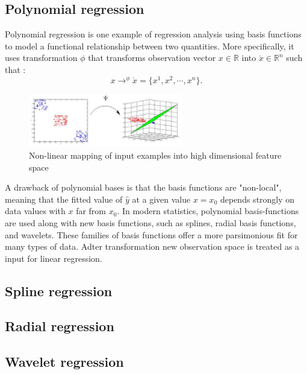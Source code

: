 \subsection{Polynomial regression}
\FloatBarrier
Polynomial regression is one example of regression analysis using basis functions to model 
a functional relationship between two quantities.
More specifically, it uses transformation $\phi$  that transforms observation vector 
$x \in \mathbb{R}$ into  $ \acute{x} \in \mathbb{R}^{n}$ such that :
\begin{equation}
 x \to^{\phi} \acute{x} = \{x^{1}, x^{2}, \cdots, x^{n}\}.
\end{equation}
\begin{figure}[htb] 
	\label{fig:space_transformation}
	\centering
	\includegraphics[width=0.6\textwidth]{figures/space_transformation}
	\caption{Non-linear mapping of input examples into high dimensional feature space}
\end{figure}
A drawback of polynomial bases is that the basis functions are "non-local",
meaning that the fitted value of $\hat{y}$ at a given value $x = x_{0}$ depends strongly on 
data values with $x$ far from $x_{0}$.
In modern statistics, polynomial basis-functions are used along with new basis functions,
such as splines, radial basis functions, and wavelets.
These families of basis functions offer a more parsimonious fit for many types of data. 
Adter transformation new observation space is treated as a input for linear regression.

\subsection{Spline regression}
\FloatBarrier
\subsection{Radial regression}
\FloatBarrier
\subsection{Wavelet regression}
\FloatBarrier


